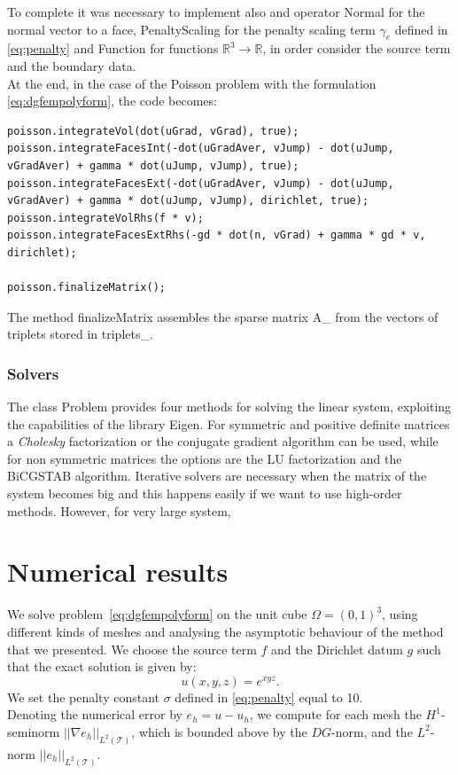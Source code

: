 \documentclass[12pt, a4paper]{article}
\newcommand{\code}[1]{{\footnotesize\ttfamily #1}}
\theoremstyle{definition}
\theoremstyle{plain}
\theoremstyle{plain}
\theoremstyle{definition}
\begin{document}
To complete it was necessary to implement also and operator \code{Normal} for the normal vector to a face, \code{PenaltyScaling} for the penalty scaling term $\gamma_e$ defined in \eqref{eq:penalty} and \code{Function} for functions $\mathbb{R}^3 \rightarrow \mathbb{R}$, in order consider the source term and the boundary data.\\
At the end, in the case of the Poisson problem with the formulation \eqref{eq:dgfempolyform}, the code becomes:
\begin{lstlisting}
poisson.integrateVol(dot(uGrad, vGrad), true);
poisson.integrateFacesInt(-dot(uGradAver, vJump) - dot(uJump, vGradAver) + gamma * dot(uJump, vJump), true);
poisson.integrateFacesExt(-dot(uGradAver, vJump) - dot(uJump, vGradAver) + gamma * dot(uJump, vJump), dirichlet, true);
poisson.integrateVolRhs(f * v);
poisson.integrateFacesExtRhs(-gd * dot(n, vGrad) + gamma * gd * v, dirichlet);

poisson.finalizeMatrix();
\end{lstlisting}
The method \code{finalizeMatrix} assembles the sparse matrix \code{A\_} from the vectors of triplets stored in \code{triplets\_}.\\
\subsubsection{Solvers}
The class \code{Problem} provides four methods for solving the linear system, exploiting the capabilities of the library Eigen. For symmetric and positive definite matrices a \emph{Cholesky} factorization or the conjugate gradient algorithm can be used, while for non symmetric matrices the options are the LU factorization and the BiCGSTAB algorithm. Iterative solvers are necessary when the matrix of the system becomes big and this happens easily if we want to use high-order methods. However, for very large system, 
\section{Numerical results}\label{sec:res}
We solve problem~\eqref{eq:dgfempolyform} on the unit cube $\Omega = (0,1)^3$, 
using different kinds of meshes and analysing the asymptotic behaviour of the 
method that we presented. We choose the source term $f$ and the Dirichlet datum 
$g$ such that the exact solution is given by:
\begin{equation*}
	u(x,y,z) = e^{xyz}.
\end{equation*}
We set the penalty constant $\sigma$ defined in \eqref{eq:penalty} equal to 10.\\
Denoting the numerical error by $e_h= u - u_h$, we compute for each mesh the 
$H^1$-seminorm $|\!| \nabla e_h |\!|_{L^2(\mathcal{T})}$, which is bounded 
above by the $DG$-norm, and the $L^2$-norm $|\!|e_h|\!|_{L^2(\mathcal{T})}$.
\end{document}
